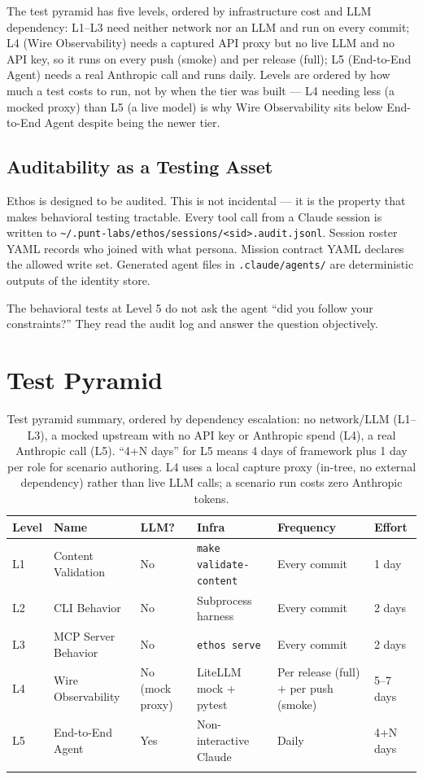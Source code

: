 \documentclass[a4paper,10pt]{article}
\newcommand{\tool}[1]{\texttt{#1}}
\newcommand{\fpath}[1]{\texttt{#1}}
\begin{document}
The test pyramid has five levels, ordered by infrastructure cost and
LLM dependency: L1--L3 need neither network nor an LLM and run on
every commit; L4 (Wire Observability) needs a captured API proxy but
no live LLM and no API key, so it runs on every push (smoke) and
per release (full); L5 (End-to-End Agent) needs a real Anthropic call
and runs daily.  Levels are ordered by how much a test costs to run,
not by when the tier was built --- L4 needing less (a mocked proxy)
than L5 (a live model) is why Wire Observability sits below
End-to-End Agent despite being the newer tier.

\subsection*{Auditability as a Testing Asset}

Ethos is designed to be audited.  This is not incidental --- it is
the property that makes behavioral testing tractable.  Every tool
call from a Claude session is written to
\fpath{\textasciitilde/.punt-labs/ethos/sessions/<sid>.audit.jsonl}.
Session roster YAML records who joined with what persona.  Mission
contract YAML declares the allowed write set.  Generated agent files
in \fpath{.claude/agents/} are deterministic outputs of the identity
store.

The behavioral tests at Level 5 do not ask the agent ``did you
follow your constraints?''  They read the audit log and answer the
question objectively.

\section{Test Pyramid}

\begin{longtable}{llllll}
\toprule
\textbf{Level} & \textbf{Name} & \textbf{LLM?} & \textbf{Infra} &
  \textbf{Frequency} & \textbf{Effort} \\
\midrule
\endhead
L1 & Content Validation    & No    & \tool{make validate-content} & Every commit & 1 day \\
L2 & CLI Behavior          & No    & Subprocess harness       & Every commit   & 2 days \\
L3 & MCP Server Behavior   & No    & \tool{ethos serve}       & Every commit   & 2 days \\
L4 & Wire Observability    & No (mock proxy) & LiteLLM mock + pytest    & Per release (full) + per push (smoke) & 5--7 days \\
L5 & End-to-End Agent      & Yes   & Non-interactive Claude   & Daily          & 4+N days \\
\bottomrule
\caption{Test pyramid summary, ordered by dependency escalation:
  no network/LLM (L1--L3), a mocked upstream with no API key or
  Anthropic spend (L4), a real Anthropic call (L5).  ``4+N days''
  for L5 means 4 days of framework plus 1 day per role for scenario
  authoring.  L4 uses a local capture proxy (in-tree, no external
  dependency) rather than live LLM calls; a scenario run costs zero
  Anthropic tokens.}
\end{longtable}
\end{document}
